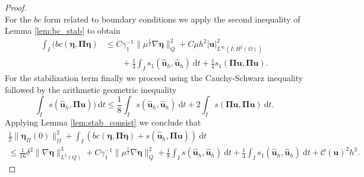 \documentclass[10pt]{amsart}
\numberwithin{equation}{section}
\theoremstyle{definition}
\theoremstyle{remark}
\renewcommand{\(}{\bigl(}
\renewcommand{\)}{\bigr)}
\newcommand{\bld}[1]{\boldsymbol{#1}}
\newcommand{\bu}{\bld{u}}
\newcommand{\bhu}{\hat{\bld{u}}}
\newcommand{\bldeta}{\bld{\eta}}
\newcommand{\bPi}{\bld{\Pi}}
\begin{document}
\begin{proof}
\[\]
For the $bc$ form related to boundary conditions we apply the second
inequality of Lemma \ref{lem:bc_stab} to obtain
\begin{align*}
\int_I (bc(\bldeta,\bPi \bldeta) &\leq C \gamma_1^{-1} \|\mu^{\frac12}
\nabla \bldeta\|_Q^2 + C \mu h^2
|\bu|_{L^{\infty}(I;H^2(\Omega))}^2 
\\
&\qquad + \frac14 \int_I s_1(\bhu_h,\bhu_h) ~\mbox{d}t +
\frac14 s_1(\bPi \bu,\bPi \bu).
\end{align*}
For the stabilization term finally we proceed using the Cauchy-Schwarz
inequality followed by the arithmetic geometric inequality
\[
\int_I s(\bhu_h,\bPi \bu)) ~\mbox{d}t \leq \frac18 \int_I
s(\bhu_h,\bhu_h) ~\mbox{d}t + 2 \int_I s(\bPi \bu,\bPi \bu) ~\mbox{d}t.
\]
Applying Lemma \ref{lem:stab_consist} we conclude that
\begin{multline}\label{eq:bc_stab_bound}
\frac12\|\bldeta_{\Pi}(0)\|_\Omega^2 +  \int_I (bc(\bldeta,\bPi
\bldeta)+ s(\bhu_h,\bPi \bu)) ~\mbox{d}t \\
\leq \frac{1}{16} \delta^2 \|\nabla \bldeta\|_{L^3(Q)}^3 + C \gamma_1^{-1} \|\mu^{\frac12}
\nabla \bldeta\|_Q^2 + \frac18 \int_I
s(\bhu_h,\bhu_h) ~\mbox{d}t  + \frac14 \int_I s_1(\bhu_h,\bhu_h)
~\mbox{d}t + \mathcal{C}(\bu)^2 h^3.
\end{multline}

\end{proof}
\end{document}
